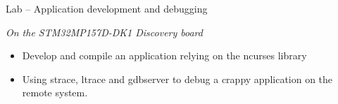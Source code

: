 \documentclass[a4paper,12pt,obeyspaces,spaces,hyphens]{article}
\begin{document}
\feagendaonecolumn
{Lab – Application development and debugging}
{
  {\em On the STM32MP157D-DK1 Discovery board}
  \begin{itemize}
  \item Develop and compile an application relying on the ncurses library
  \item Using strace, ltrace and gdbserver to debug a crappy application
        on the remote system.
  \end{itemize}
}
\end{document}
